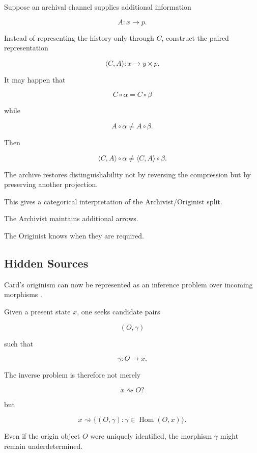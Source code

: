 \documentclass[
  11pt,
  a4paper,
  DIV=12,
  BCOR=0mm,
  parskip=half-
]{scrartcl}
\newcommand{\Hom}{\operatorname{Hom}}
\theoremstyle{definition}
\theoremstyle{plain}
\theoremstyle{remark}
\begin{document}
Suppose an archival channel supplies additional information

\[
  A:x\to p.
\]

Instead of representing the history only through \(C\), construct the paired
representation

\[
  \langle C,A\rangle:
  x\to y\times p.
\]

It may happen that

\[
  C\circ\alpha=C\circ\beta
\]

while

\[
  A\circ\alpha\neq A\circ\beta.
\]

Then

\[
  \langle C,A\rangle\circ\alpha
  \neq
  \langle C,A\rangle\circ\beta.
\]

The archive restores distinguishability not by reversing the compression but
by preserving another projection.

This gives a categorical interpretation of the Archivist/Originist split.

The Archivist maintains additional arrows.

The Originist knows when they are required.


\subsection{Hidden Sources}
\label{app:card-categorical}

Card's originism can now be represented as an inference problem over incoming
morphisms \cite{card1989}.

Given a present state \(x\), one seeks candidate pairs

\[
  (O,\gamma)
\]

such that

\[
  \gamma:O\to x.
\]

The inverse problem is therefore not merely

\[
  x\rightsquigarrow O?
\]

but

\[
  x
  \rightsquigarrow
  \{
    (O,\gamma)
    :
    \gamma\in\Hom(O,x)
  \}.
\]

Even if the origin object \(O\) were uniquely identified, the morphism
\(\gamma\) might remain underdetermined.
\end{document}
